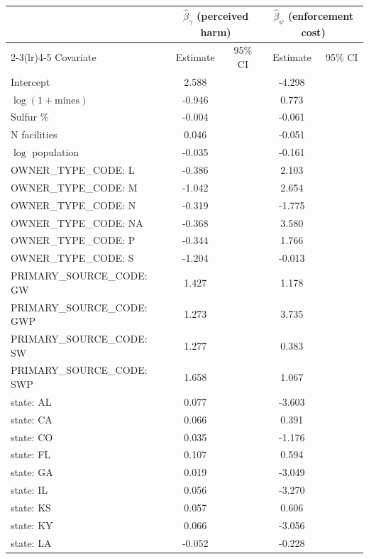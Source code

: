 \makeatletter
{}%
\makeatother
\begin{tabular}{lcccc}
\toprule
 & \multicolumn{2}{c}{$\hat{\beta}_\gamma$ (perceived harm)} & \multicolumn{2}{c}{$\hat{\beta}_\psi$ (enforcement cost)} \\
\cmidrule(lr){2-3}\cmidrule(lr){4-5}
Covariate & Estimate & 95\% CI & Estimate & 95\% CI \\
\midrule
Intercept & 2.588 &  & -4.298 &  \\
$\log(1+\text{mines})$ & -0.946 &  & 0.773 &  \\
Sulfur \% & -0.004 &  & -0.061 &  \\
N facilities & 0.046 &  & -0.051 &  \\
$\log$ population & -0.035 &  & -0.161 &  \\
OWNER_TYPE_CODE: L & -0.386 &  & 2.103 &  \\
OWNER_TYPE_CODE: M & -1.042 &  & 2.654 &  \\
OWNER_TYPE_CODE: N & -0.319 &  & -1.775 &  \\
OWNER_TYPE_CODE: NA & -0.368 &  & 3.580 &  \\
OWNER_TYPE_CODE: P & -0.344 &  & 1.766 &  \\
OWNER_TYPE_CODE: S & -1.204 &  & -0.013 &  \\
PRIMARY_SOURCE_CODE: GW & 1.427 &  & 1.178 &  \\
PRIMARY_SOURCE_CODE: GWP & 1.273 &  & 3.735 &  \\
PRIMARY_SOURCE_CODE: SW & 1.277 &  & 0.383 &  \\
PRIMARY_SOURCE_CODE: SWP & 1.658 &  & 1.067 &  \\
state: AL & 0.077 &  & -3.603 &  \\
state: CA & 0.066 &  & 0.391 &  \\
state: CO & 0.035 &  & -1.176 &  \\
state: FL & 0.107 &  & 0.594 &  \\
state: GA & 0.019 &  & -3.049 &  \\
state: IL & 0.056 &  & -3.270 &  \\
state: KS & 0.057 &  & 0.606 &  \\
state: KY & 0.066 &  & -3.056 &  \\
state: LA & -0.052 &  & -0.228 &  \\

\end{tabular}

